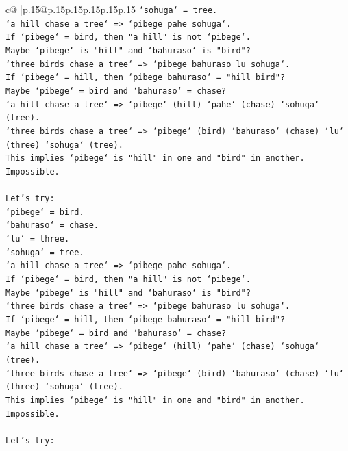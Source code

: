\documentclass{article}
\begin{document}
{\begin{supertabular}{c@{$\;$}|p{.15\linewidth}@{}p{.15\linewidth}p{.15\linewidth}p{.15\linewidth}p{.15\linewidth}p{.15\linewidth}}
{{{\texttt{`sohuga` = tree.} \\
\texttt{`a hill chase a tree` => `pibege pahe sohuga`.} \\
\texttt{If `pibege` = bird, then "a hill" is not `pibege`.} \\
\texttt{Maybe `pibege` is "hill" and `bahuraso` is "bird"?} \\
\texttt{`three birds chase a tree` => `pibege bahuraso lu sohuga`.} \\
\texttt{If `pibege` = hill, then `pibege bahuraso` = "hill bird"?} \\
\texttt{Maybe `pibege` = bird and `bahuraso` = chase?} \\
\texttt{`a hill chase a tree` => `pibege` (hill) `pahe` (chase) `sohuga` (tree).} \\
\texttt{`three birds chase a tree` => `pibege` (bird) `bahuraso` (chase) `lu` (three) `sohuga` (tree).} \\
\texttt{This implies `pibege` is "hill" in one and "bird" in another. Impossible.} \\
\\ 
\texttt{Let's try:} \\
\texttt{`pibege` = bird.} \\
\texttt{`bahuraso` = chase.} \\
\texttt{`lu` = three.} \\
\texttt{`sohuga` = tree.} \\
\texttt{`a hill chase a tree` => `pibege pahe sohuga`.} \\
\texttt{If `pibege` = bird, then "a hill" is not `pibege`.} \\
\texttt{Maybe `pibege` is "hill" and `bahuraso` is "bird"?} \\
\texttt{`three birds chase a tree` => `pibege bahuraso lu sohuga`.} \\
\texttt{If `pibege` = hill, then `pibege bahuraso` = "hill bird"?} \\
\texttt{Maybe `pibege` = bird and `bahuraso` = chase?} \\
\texttt{`a hill chase a tree` => `pibege` (hill) `pahe` (chase) `sohuga` (tree).} \\
\texttt{`three birds chase a tree` => `pibege` (bird) `bahuraso` (chase) `lu` (three) `sohuga` (tree).} \\
\texttt{This implies `pibege` is "hill" in one and "bird" in another. Impossible.} \\
\\ 
\texttt{Let's try:} \\
}}}
\end{supertabular}}
\end{document}
